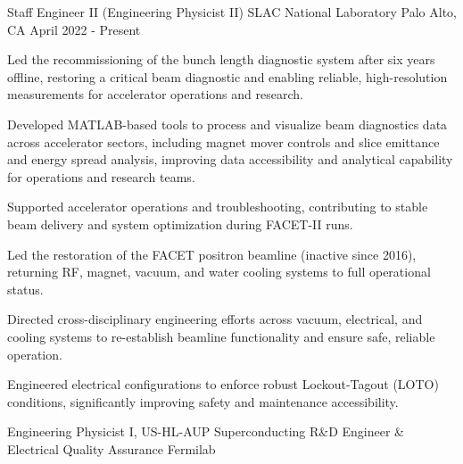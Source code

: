 \vspace{-3mm}


\begin{cventries}


\cventry
{Staff Engineer II (Engineering Physicist II)}
{SLAC National Laboratory}
{Palo Alto, CA}
{April 2022 - Present}
{
\begin{cvitems}
\item {Led the recommissioning of the bunch length diagnostic system after six years offline, restoring a critical beam diagnostic and enabling reliable, high-resolution measurements for accelerator operations and research.}
\item {Developed MATLAB-based tools to process and visualize beam diagnostics data across accelerator sectors, including magnet mover controls and slice emittance and energy spread analysis, improving data accessibility and analytical capability for operations and research teams.}
\item {Supported accelerator operations and troubleshooting, contributing to stable beam delivery and system optimization during FACET-II runs.}
\item {Led the restoration of the FACET positron beamline (inactive since 2016), returning RF, magnet, vacuum, and water cooling systems to full operational status.}
\item {Directed cross-disciplinary engineering efforts across vacuum, electrical, and cooling systems to re-establish beamline functionality and ensure safe, reliable operation.}
\item {Engineered electrical configurations to enforce robust Lockout-Tagout (LOTO) conditions, significantly improving safety and maintenance accessibility.}
\end{cvitems}
}
\vspace{1.5mm}
\cventry
{Engineering Physicist I, US-HL-AUP Superconducting R\&D Engineer \& Electrical Quality Assurance}
{Fermilab}

\end{cventries}
